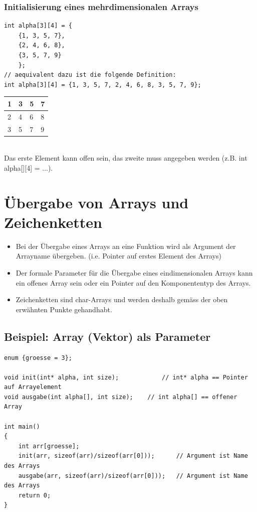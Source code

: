 \subsubsection{Initialisierung eines mehrdimensionalen Arrays}
\vspace{-\baselineskip}
\begin{minipage}{0.68\linewidth}	
\begin{lstlisting}
int alpha[3][4] = {
	{1, 3, 5, 7},
	{2, 4, 6, 8},
	{3, 5, 7, 9}
	};
// aequivalent dazu ist die folgende Definition:
int alpha[3][4] = {1, 3, 5, 7, 2, 4, 6, 8, 3, 5, 7, 9};
\end{lstlisting}
\end{minipage}
\hfill
\begin{minipage}{0.25\linewidth}
\begin{tabularx}{\textwidth}{|X|X|X|X|}
	\hline
	1 & 3 & 5 & 7\\
	\hline
	2 & 4 & 6 & 8\\
	\hline
	3 & 5 & 7 & 9\\
	\hline
\end{tabularx}
\end{minipage}\\
Das erste Element kann offen sein, das zweite muss angegeben werden (z.B. int alpha[][4] = ...).

\section{Übergabe von Arrays und Zeichenketten}
\begin{itemize}
	\item Bei der Übergabe eines Arrays an eine Funktion wird als Argument der Arrayname übergeben. (i.e. Pointer auf erstes Element des Arrays)
	\item Der formale Parameter für die Übergabe eines eindimensionalen Arrays kann ein offenes Array sein oder ein Pointer auf den Komponententyp des Arrays.
	\item Zeichenketten sind char-Arrays und werden deshalb gemäss der oben erwähnten Punkte gehandhabt.
\end{itemize}

\subsection{Beispiel: Array (Vektor) als Parameter}
\vspace{-\baselineskip}
\begin{minipage}{\linewidth}
\begin{lstlisting}
enum {groesse = 3};

void init(int* alpha, int size);			// int* alpha == Pointer auf Arrayelement
void ausgabe(int alpha[], int size);	// int alpha[] == offener Array

int main()
{
	int arr[groesse];
	init(arr, sizeof(arr)/sizeof(arr[0]));		// Argument ist Name des Arrays
	ausgabe(arr, sizeof(arr)/sizeof(arr[0]));	// Argument ist Name des Arrays
	return 0;
}
\end{lstlisting}
\end{minipage}

